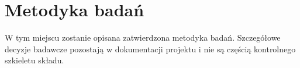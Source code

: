 \chapter{Metodyka badań}

W tym miejscu zostanie opisana zatwierdzona metodyka badań. Szczegółowe decyzje badawcze pozostają w dokumentacji projektu i nie są częścią kontrolnego szkieletu składu.
